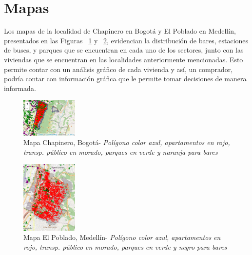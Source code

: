 \documentclass[conference, 10pt]{IEEEtran}
\begin{document}
\section{Mapas}
Los mapas de la localidad de Chapinero en Bogotá y El Poblado en Medellín, presentados en las Figuras ~\ref{fig_1} y ~\ref{fig_2},  evidencian la distribución de bares, estaciones de buses, y parques que se encuentran en cada uno de los sectores, junto con las viviendas que se encuentran en las localidades anteriormente mencionadas. Esto permite contar con un análisis gráfico de cada vivienda y así, un comprador, podría contar con información gráfica que le permite tomar decisiones de manera informada.

\begin{figure}[htbp]
\centerline{\includegraphics[width=0.25\textwidth]{../Vistas/Mapa_Chapinero_2.2.png}}
\caption{Mapa Chapinero, Bogotá- \textit{Polígono color azul, apartamentos en rojo, transp. público en morado, parques en verde y naranja para bares}}
\label{fig_1}
\end{figure}

\begin{figure}[htbp]
\centerline{\includegraphics[width=0.25\textwidth]{../Vistas/MapaPoblado1.png}}
\caption{Mapa El Poblado, Medellín- \textit{Polígono color azul, apartamentos en rojo, transp. público en morado, parques en verde y negro para bares}}
\label{fig_2}
\end{figure}
\end{document}
